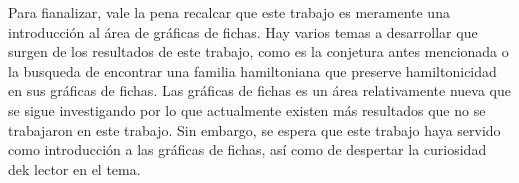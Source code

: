 Para fianalizar, vale la pena recalcar que este trabajo es meramente una
introducci\'on al \'area de gr\'aficas de fichas. Hay varios temas a desarrollar
que surgen de los resultados de este trabajo, como es la conjetura antes
mencionada o la busqueda de encontrar una familia hamiltoniana que preserve
hamiltonicidad en sus gr\'aficas de fichas. Las gr\'aficas de fichas es un
\'area relativamente nueva que se sigue investigando por lo que actualmente
existen m\'as resultados que no se trabajaron en este trabajo. Sin embargo, se
espera que este trabajo haya servido como introducci\'on a las gr\'aficas de
fichas, as\'i como de despertar la curiosidad dek lector en el tema.